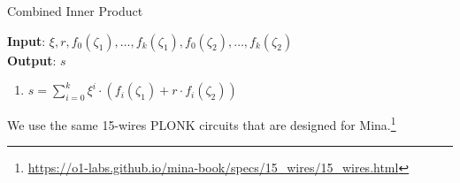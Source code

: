 \begin{algorithm}[H]
    \caption{Combined Inner Product}
    \textbf{Input}: $\xi, r, f_0(\zeta_1), \dots, f_k(\zeta_1), f_0(\zeta_2), \dots, f_k(\zeta_2)$ \\ %
    \textbf{Output}: $s$
    \begin{enumerate}
        \item $s = \sum\limits_{i = 0}^{k} \xi^i \cdot (f_i(\zeta_1) + r \cdot f_i(\zeta_2))$
    \end{enumerate}
\end{algorithm}

We use the same 15-wires PLONK circuits that are designed for Mina.\footnote{\url{https://o1-labs.github.io/mina-book/specs/15_wires/15_wires.html}}